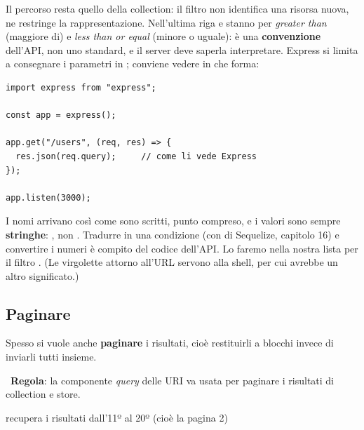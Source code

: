 Il percorso resta quello della collection: il filtro non identifica una risorsa
nuova, ne restringe la rappresentazione. Nell'ultima riga  e
 stanno per \textit{greater than} (maggiore di) e \textit{less than or
equal} (minore o uguale): è una \textbf{convenzione} dell'API, non uno
standard, e il server deve saperla interpretare. Express si limita a consegnare
i parametri in ; conviene vedere in che forma:

\begin{affianco}[0.45][c]
\begin{lstlisting}[style=js, name=query.js]
import express from "express";

const app = express();

app.get("/users", (req, res) => {
  res.json(req.query);     // come li vede Express
});

app.listen(3000);
\end{lstlisting}
\risultato
{}
\end{affianco}

I nomi arrivano così come sono scritti, punto compreso, e i valori sono sempre
\textbf{stringhe}: , non . Tradurre  in una
condizione (con  di Sequelize, capitolo 16) e convertire i numeri è
compito del codice dell'API. Lo faremo nella nostra lista per il filtro
. (Le virgolette attorno all'URL servono alla shell, per cui
\code{\&} avrebbe un altro significato.)

\subsection{Paginare}

Spesso si vuole anche \textbf{paginare} i risultati, cioè restituirli a blocchi
invece di inviarli tutti insieme.

\mok\ \textbf{Regola}: la componente \textit{query} delle URI va usata per
paginare i risultati di collection e store.

\begin{center}
\qquad recupera i risultati dall'11º al 20º
(cioè la pagina 2)
\end{center}

